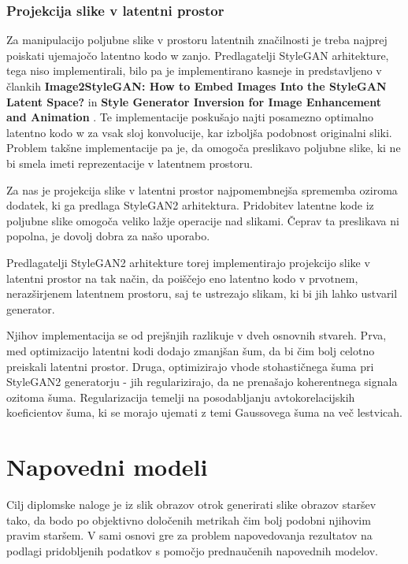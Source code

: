 \documentclass[a4paper,12pt,openright]{book}
\begin{document}
\subsubsection{Projekcija slike v latentni prostor}
Za manipulacijo poljubne slike v prostoru latentnih značilnosti je treba najprej poiskati ujemajočo latentno kodo w zanjo. Predlagatelji StyleGAN arhitekture, tega niso implementirali, bilo pa je implementirano kasneje in predstavljeno v člankih \textbf{Image2StyleGAN: How to Embed Images Into the StyleGAN Latent Space?} \cite{Image2StyleGAN2019} in \textbf{Style Generator Inversion for Image Enhancement and Animation} \cite{gabbay2019style}. Te implementacije poskušajo najti posamezno optimalno latentno kodo w za vsak sloj konvolucije, kar izboljša podobnost originalni sliki. Problem takšne implementacije pa je, da omogoča preslikavo poljubne slike, ki ne bi smela imeti reprezentacije v latentnem prostoru. 

Za nas je projekcija slike v latentni prostor najpomembnejša sprememba oziroma dodatek, ki ga predlaga StyleGAN2 arhitektura. Pridobitev latentne kode iz poljubne slike omogoča veliko lažje operacije nad slikami. Čeprav ta preslikava ni popolna, je dovolj dobra za našo uporabo.

Predlagatelji StyleGAN2 arhitekture torej implementirajo projekcijo slike v latentni prostor na tak način, da poiščejo eno latentno kodo v prvotnem, nerazširjenem latentnem prostoru, saj te ustrezajo slikam, ki bi jih lahko ustvaril generator.

Njihov implementacija se od prejšnjih razlikuje v dveh osnovnih stvareh. Prva, med optimizacijo latentni kodi dodajo zmanjšan šum, da bi čim bolj celotno preiskali latentni prostor. Druga, optimizirajo vhode stohastičnega šuma pri StyleGAN2 generatorju - jih regularizirajo, da ne prenašajo koherentnega signala ozitoma šuma. Regularizacija temelji na posodabljanju avtokorelacijskih koeficientov šuma, ki se morajo ujemati z temi Gaussovega šuma na več lestvicah.





\section{Napovedni modeli}

Cilj diplomske naloge je iz slik obrazov otrok generirati slike obrazov staršev tako, da bodo po objektivno določenih metrikah čim bolj podobni njihovim pravim staršem. V sami osnovi gre za problem napovedovanja rezultatov na podlagi pridobljenih podatkov s pomočjo prednaučenih napovednih modelov.
\end{document}
